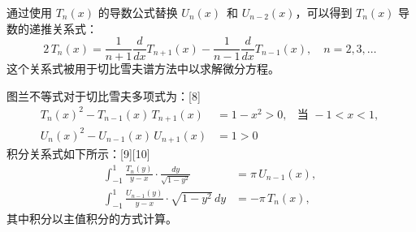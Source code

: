通过使用 $T_n(x)$ 的导数公式替换 $U_n(x)$  和 $U_{n-2}(x)$，可以得到 $T_n(x)$ 导数的递推关系式：
$$
2\,T_n(x) = \frac{1}{n+1} \frac{d}{dx} T_{n+1}(x) - \frac{1}{n-1} \frac{d}{dx} T_{n-1}(x), \quad n = 2, 3, \ldots~
$$
这个关系式被用于切比雪夫谱方法中以求解微分方程。

图兰不等式对于切比雪夫多项式为：[8]
$$
\begin{aligned}
T_n(x)^2 - T_{n-1}(x)\,T_{n+1}(x) &= 1 - x^2 > 0, & \text{当 } -1 < x < 1, \\
U_n(x)^2 - U_{n-1}(x)\,U_{n+1}(x) &= 1 > 0
\end{aligned}~
$$
积分关系式如下所示：[9][10]
$$
\begin{aligned}
\int_{-1}^{1} \frac{T_n(y)}{y - x} \cdot \frac{dy}{\sqrt{1 - y^2}} &= \pi\, U_{n-1}(x), \\
\int_{-1}^{1} \frac{U_{n-1}(y)}{y - x} \cdot \sqrt{1 - y^2}\,dy &= -\pi\, T_n(x),
\end{aligned}~
$$
其中积分以主值积分的方式计算。

